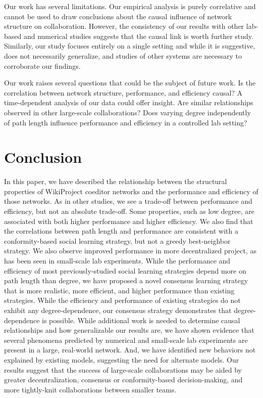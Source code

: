 Our work has several limitations.
Our empirical analysis is purely correlative and cannot be used to draw
conclusions about the causal influence of network structure on collaboration.
However, the consistency of our results with other lab-based and numerical studies
suggests that the causal link is worth further study.
Similarly, our study focuses entirely on a single setting and while it is suggestive,
does not necessarily generalize,
and studies of other systems are necessary to corroborate our findings.

Our work raises several questions that could be the subject of future work.
Is the correlation between network structure, performance, and efficiency causal?
A time-dependent analysis of our data could offer insight.
Are similar relationships observed in other large-scale collaborations?
Does varying degree independently of path length influence performance and efficiency in a controlled
lab setting?

\section{Conclusion}
\label{sec:conclusion}

In this paper, we have described the relationship between the structural properties of WikiProject
coeditor networks and the performance and efficiency of those networks.
As in other studies, we see a trade-off between performance and efficiency,
but not an absolute trade-off.
Some properties, such as low degree, are associated with both higher performance and higher efficiency.
We also find that the correlations between path length and performance are consistent with a conformity-based
social learning strategy, but not a greedy best-neighbor strategy.
We also observe improved performance in more decentralized project, as has been seen in small-scale lab experiments.
While the performance and efficiency of most previously-studied social learning strategies depend more on path length than
degree,
we have proposed a novel consensus learning strategy that is more realistic, more efficient, and higher performance than
existing strategies.
While the efficiency and performance of existing strategies do not exhibit any degree-dependence, our consensus strategy
demonstrates that degree-dependence is possible.
While additional work is needed to determine causal relationships and how generalizable our results are,
we have shown evidence that several phenomena predicted by numerical and small-scale lab experiments are present in a large,
real-world network.
And, we have identified new behaviors not explained by existing models, suggesting the need for alternate models.
Our results suggest that the success of large-scale collaborations may be aided by greater decentralization,
consensus or conformity-based decision-making, and more tightly-knit collaborations between smaller teams.


